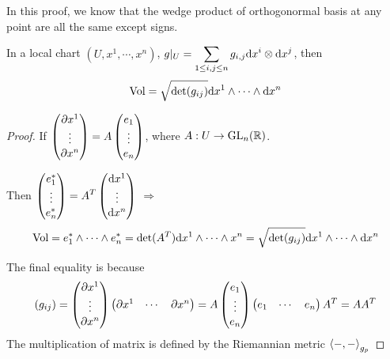 \begin{remark}
    In this proof, we know that the wedge product of orthogonormal basis at any point are all the same except signs.
\end{remark}
\begin{proposition}\label{prop:Calculation of volume form in local chart}
    In a local chart  $ (U,x^1,\cdots,x^n ) $,  $ g|_U =\displaystyle\sum_{1 \leq i,j \leq n}g_{i,j}\mathrm{d} x^i\otimes \mathrm{d} x^j $, then 
    \begin{equation}
        \mathrm{Vol}=\sqrt{\det(g_{ij})}\mathrm{d} x^1\wedge\cdots\wedge \mathrm{d} x^n\label{eq:Calculation of volume form in local chart}
    \end{equation} 
\end{proposition}
\begin{proof}
    If  $ \displaystyle\begin{pmatrix}
        \partial x^1\\
        \vdots\\
        \partial x^n
    \end{pmatrix}=A\begin{pmatrix}
        e_1\\
        \vdots\\
        e_n
    \end{pmatrix} $, where  $ A:U\rightarrow \mathrm{GL}_n(\mathbb R) $.
    
    Then  $ \displaystyle\begin{pmatrix}
        e_1^*\\
        \vdots\\
        e_n^*
    \end{pmatrix}=A^T\begin{pmatrix}
        \mathrm{d} x^1\\
        \vdots\\
        \mathrm{d} x^n
    \end{pmatrix} $ $ \Rightarrow  $ \[\mathrm{Vol}=e_1^*\wedge\cdots\wedge e_n^*=\det(A^T)\mathrm{d} x^1\wedge\cdots\wedge x^n=\sqrt{\det(g_{ij})}\mathrm{d} x^1\wedge\cdots\wedge \mathrm{d} x^n \]
    
    The final equality is because  \[\displaystyle (g_{ij})=\displaystyle\begin{pmatrix}
        \partial x^1\\
        \vdots\\
        \partial x^n
    \end{pmatrix}\begin{pmatrix}
        \partial x^1&\cdots &\partial x^n
    \end{pmatrix}=A\begin{pmatrix}
        e_1\\
        \vdots\\
        e_n
    \end{pmatrix}\begin{pmatrix}
        e_1&\cdots&e_n
    \end{pmatrix}A^T=AA^T \]
    The multiplication of matrix is defined by the Riemannian metric  $ \left<-,-\right>_{g_p} $ 
\end{proof}
